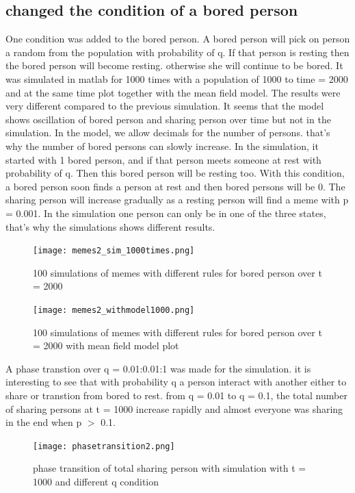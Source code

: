 \documentclass[12pt]{article}
\begin{document}
\subsection{changed the condition of a bored person}
One condition was added to the bored person. A bored person will pick on person a random from the population with probability of q. If that person is resting then the bored person will become resting. otherwise she will continue to be bored. It was simulated in matlab for 1000 times with a population of 1000 to time = 2000 and at the same time plot together with the mean field model. The results were very different compared to the previous simulation. It seems that the model shows oscillation of bored person and sharing person over time but not in the simulation. In the model, we allow decimals for the number of persons. that's why the number of bored persons can slowly increase. In the simulation, it started with 1 bored person, and if that person meets someone at rest with probability of q. Then this bored person will be resting too. With this condition, a bored person soon finds a person at rest and then bored persons will be 0. The sharing person will increase gradually as a resting person will find a meme with p = 0.001. In the simulation one person can only be in one of the three states, that's why the simulations shows different results. 

\begin{figure}[H] %
\centering
\texttt{[image: memes2\_sim\_1000times.png]}
\caption{100 simulations of memes with different rules for bored person over t = 2000  }
\label{fig:meme2sim1000}
\end{figure}

\begin{figure}[H] %
\centering
\texttt{[image: memes2\_withmodel1000.png]}
\caption{100 simulations of memes with different rules for bored person over t = 2000  with mean field model plot}
\label{fig:meme2sim1000model}
\end{figure}

A phase transtion over q = 0.01:0.01:1 was made for the simulation. it is interesting to see that with probability q a person interact with another either to share or transtion from bored to rest. from q = 0.01 to q = 0.1, the total number of sharing persons at t = 1000 increase rapidly and almost everyone was sharing in the end when p $>$ 0.1. 
\begin{figure}[H] %
\centering
\texttt{[image: phasetransition2.png]}
\caption{phase transition of total sharing person with simulation with t = 1000 and different q condition }
\label{fig:phasetransition2}
\end{figure}
\end{document}
